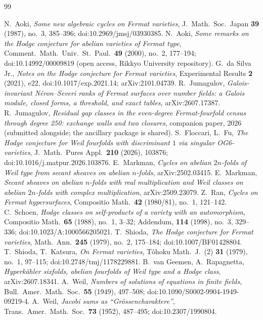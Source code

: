 \documentclass[11pt]{amsart}
\theoremstyle{remark}
\begin{document}
\begin{thebibliography}{99}
\raggedright
{} N.~Aoki, \emph{Some new algebraic cycles on Fermat varieties}, J.~Math.\ Soc.\ Japan
\textbf{39} (1987), no.~3, 385--396; doi:10.2969/jmsj/03930385.
 N.~Aoki, \emph{Some remarks on the Hodge conjecture for abelian varieties of Fermat
type}, Comment.\ Math.\ Univ.\ St.\ Paul.\ \textbf{49} (2000), no.~2, 177--194;
doi:10.14992/00009819 (open access, Rikkyo University repository).
 G.~da Silva Jr., \emph{Notes on the Hodge conjecture for Fermat varieties},
Experimental Results \textbf{2} (2021), e22, doi:10.1017/exp.2021.14; arXiv:2101.04739.
 R.~Jumagulov, \emph{Galois-invariant N\'eron--Severi ranks of Fermat surfaces over
number fields: a Galois module, closed forms, a threshold, and exact tables}, arXiv:2607.17387.
 R.~Jumagulov, \emph{Residual gap classes in the even-degree Fermat-fourfold
census through degree 250: exchange walls and two closures}, companion paper, 2026 (submitted
alongside; the ancillary package is shared).
 S.~Floccari, L.~Fu, \emph{The Hodge conjecture for Weil fourfolds with
discriminant $1$ via singular OG6-varieties}, J.~Math.\ Pures Appl.\ \textbf{210} (2026),
103876; doi:10.1016/j.matpur.2026.103876.
 E.~Markman, \emph{Cycles on abelian $2n$-folds of Weil type from secant sheaves
on abelian $n$-folds}, arXiv:2502.03415.
 E.~Markman, \emph{Secant sheaves on abelian $n$-folds with real multiplication
and Weil classes on abelian $2n$-folds with complex multiplication}, arXiv:2509.23079.
 Z.~Ran, \emph{Cycles on Fermat hypersurfaces}, Compositio Math.\ \textbf{42}
(1980/81), no.~1, 121--142.
 C.~Schoen, \emph{Hodge classes on self-products of a variety with an automorphism},
Compositio Math.\ \textbf{65} (1988), no.~1, 3--32; Addendum, \textbf{114} (1998), no.~3,
329--336; doi:10.1023/A:1000566205021.
 T.~Shioda, \emph{The Hodge conjecture for Fermat varieties}, Math.\ Ann.\ \textbf{245}
(1979), no.~2, 175--184; doi:10.1007/BF01428804.
 T.~Shioda, T.~Katsura, \emph{On Fermat varieties}, T\^ohoku Math.\ J.\ (2)
\textbf{31} (1979), no.~1, 97--115; doi:10.2748/tmj/1178229881.
 B.~van Geemen, A.~Rapagnetta, \emph{Hyperk\"ahler sixfolds, abelian fourfolds of
Weil type and a Hodge class}, arXiv:2607.18341.
 A.~Weil, \emph{Numbers of solutions of equations in finite fields}, Bull.\ Amer.\
Math.\ Soc.\ \textbf{55} (1949), 497--508; doi:10.1090/S0002-9904-1949-09219-4.
\bibitem{Weil52} A.~Weil, \emph{Jacobi sums as ``Gr\"ossencharaktere''}, Trans.\ Amer.\ Math.\ Soc.\
\textbf{73} (1952), 487--495; doi:10.2307/1990804.
\end{thebibliography}
\end{document}
